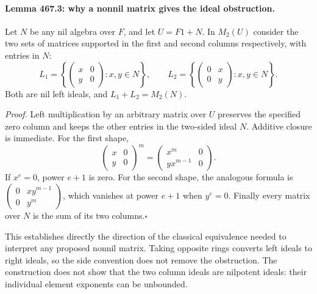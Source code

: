 \documentclass[11pt]{article}
\begin{document}
\paragraph{Lemma 467.3: why a nonnil matrix gives the ideal obstruction.}
Let $N$ be any nil algebra over $F$, and let $U=F1+N$. In $M_2(U)$
consider the two sets of matrices supported in the first and second
columns respectively, with entries in $N$:
\[
 L_1=\left\{\begin{pmatrix}x&0\\y&0\end{pmatrix}:x,y\in N\right\},
 \qquad
 L_2=\left\{\begin{pmatrix}0&x\\0&y\end{pmatrix}:x,y\in N\right\}.
\]
Both are nil left ideals, and $L_1+L_2=M_2(N)$.

\emph{Proof.} Left multiplication by an arbitrary matrix over $U$
preserves the specified zero column and keeps the other entries in the
two-sided ideal $N$. Additive closure is immediate. For the first shape,
\[
 \begin{pmatrix}x&0\\y&0\end{pmatrix}^{m}
 =\begin{pmatrix}x^m&0\\yx^{m-1}&0\end{pmatrix}.
\]
If $x^e=0$, power $e+1$ is zero. For the second shape, the analogous
formula is
$\left(\begin{smallmatrix}0&xy^{m-1}\\0&y^m\end{smallmatrix}\right)$,
which vanishes at power $e+1$ when $y^e=0$. Finally every matrix over
$N$ is the sum of its two columns.\hfill$\square$

This establishes directly the direction of the classical equivalence
needed to interpret any proposed nonnil matrix. Taking opposite rings
converts left ideals to right ideals, so the side convention does not
remove the obstruction. The construction does not show that the two
column ideals are nilpotent ideals: their individual element exponents
can be unbounded.
\end{document}
